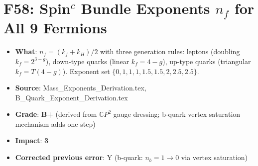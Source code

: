 \documentclass[11pt,a4paper]{article}
\newcommand{\grade}[1]{\textbf{#1}}
\newcommand{\impact}[1]{\textbf{#1}}
\begin{document}
\section{F58: Spin$^c$ Bundle Exponents $n_f$ for All 9 Fermions}
\begin{itemize}[nosep]
\item \textbf{What}: $n_f = (k_f + k_H)/2$ with three generation rules: leptons (doubling $k_f = 2^{3-g}$), down-type quarks (linear $k_f = 4-g$), up-type quarks (triangular $k_f = T(4-g)$). Exponent set $\{0, 1, 1, 1, 1.5, 1.5, 2, 2.5, 2.5\}$.
\item \textbf{Source}: Mass\_Exponents\_Derivation.tex, B\_Quark\_Exponent\_Derivation.tex
\item \textbf{Grade}: \grade{B+} (derived from $\mathbb{C}P^2$ gauge dressing; b-quark vertex saturation mechanism adds one step)
\item \textbf{Impact}: \impact{3}
\item \textbf{Corrected previous error}: Y (b-quark: $n_b = 1 \to 0$ via vertex saturation)
\end{itemize}

\end{document}
